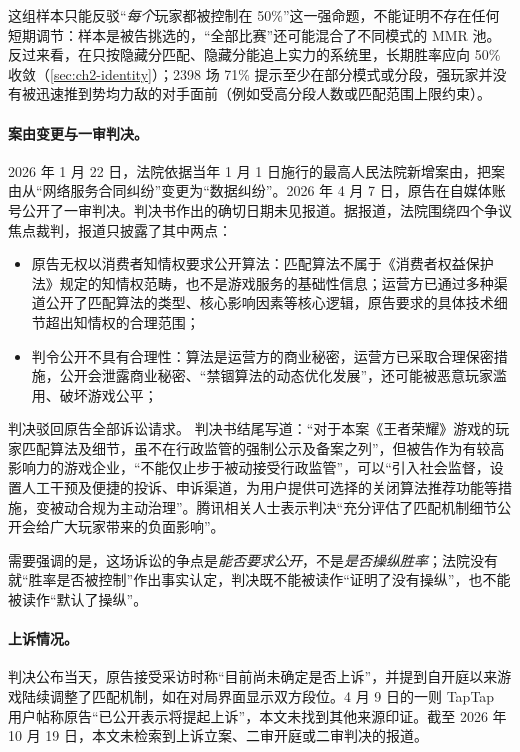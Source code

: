 这组样本只能反驳“\emph{每个}玩家都被控制在 50\%”这一强命题，不能证明不存在任何短期调节：样本是被告挑选的，“全部比赛”还可能混合了不同模式的 MMR 池。反过来看，在只按隐藏分匹配、隐藏分能追上实力的系统里，长期胜率应向 50\% 收敛（\cref{sec:ch2-identity}）；2398 场 71\% 提示至少在部分模式或分段，强玩家并没有被迅速推到势均力敌的对手面前（例如受高分段人数或匹配范围上限约束）\tagOwn。

\paragraph{案由变更与一审判决。}
2026 年 1 月 22 日，法院依据当年 1 月 1 日施行的最高人民法院新增案由，把案由从“网络服务合同纠纷”变更为“数据纠纷”\cite{zhang2026hokfeb}\tagOff。2026 年 4 月 7 日，原告在自媒体账号公开了一审判决\cite{ithome2026hok}\tagOff。判决书作出的确切日期未见报道。据报道，法院围绕四个争议焦点裁判，报道只披露了其中两点\cite{zhang2026hok}\tagOff：
\begin{itemize}
  \item 原告无权以消费者知情权要求公开算法：匹配算法不属于《消费者权益保护法》规定的知情权范畴，也不是游戏服务的基础性信息；运营方已通过多种渠道公开了匹配算法的类型、核心影响因素等核心逻辑，原告要求的具体技术细节超出知情权的合理范围；
  \item 判令公开不具有合理性：算法是运营方的商业秘密，运营方已采取合理保密措施，公开会泄露商业秘密、“禁锢算法的动态优化发展”，还可能被恶意玩家滥用、破坏游戏公平；
\end{itemize}
判决驳回原告全部诉讼请求\cite{zhang2026hok}\tagOff。
判决书结尾写道：“对于本案《王者荣耀》游戏的玩家匹配算法及细节，虽不在行政监管的强制公示及备案之列”，但被告作为有较高影响力的游戏企业，“不能仅止步于被动接受行政监管”，可以“引入社会监督，设置人工干预及便捷的投诉、申诉渠道，为用户提供可选择的关闭算法推荐功能等措施，变被动合规为主动治理”\cite{tonghuashun2026hok}\tagOff。腾讯相关人士表示判决“充分评估了匹配机制细节公开会给广大玩家带来的负面影响”\cite{tonghuashun2026hok}\tagOff。

需要强调的是，这场诉讼的争点是\emph{能否要求公开}，不是\emph{是否操纵胜率}；法院没有就“胜率是否被控制”作出事实认定，判决既不能被读作“证明了没有操纵”，也不能被读作“默认了操纵”。

\paragraph{上诉情况。}
判决公布当天，原告接受采访时称“目前尚未确定是否上诉”，并提到自开庭以来游戏陆续调整了匹配机制，如在对局界面显示双方段位\cite{tonghuashun2026hok}\tagOff。4 月 9 日的一则 TapTap 用户帖称原告“已公开表示将提起上诉”\cite{taptap2026hok}\tagCom，本文未找到其他来源印证。截至 2026 年 10 月 19 日，本文未检索到上诉立案、二审开庭或二审判决的报道\needcheck[；需在中国裁判文书网或深圳市中级人民法院公开信息中核对]。

